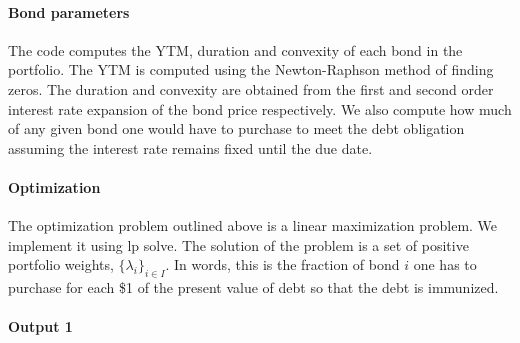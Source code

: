 \documentclass[12pt]{article}
\begin{document}
\paragraph{Bond parameters} The code computes the YTM, duration and convexity of each bond in the portfolio. The YTM is computed using the Newton-Raphson method of finding zeros. The duration and convexity are obtained from the first and second order interest rate expansion of the bond price respectively. We also compute how much of any given bond one would have to purchase to meet the debt obligation assuming the interest rate remains fixed until the due date. 

\paragraph{Optimization}

The optimization problem outlined above is a linear maximization problem. We implement it using lp solve. The solution of the problem is a set of positive portfolio weights, $\{\lambda_i\}_{i\in I}$. In words, this is the fraction of bond $i$ one has to purchase for each \$1 of the present value of debt so that the debt is immunized.

\paragraph{Output 1}
\end{document}
